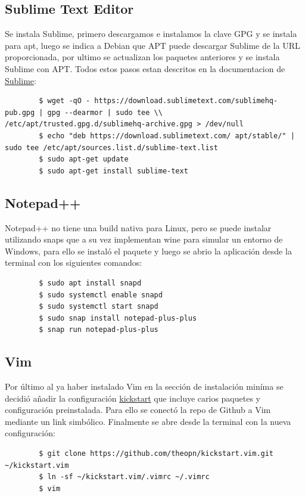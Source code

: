 \documentclass{article}
\begin{document}
    \subsection{Sublime Text Editor}
    Se instala Sublime, primero descargamos e instalamos la clave GPG y se instala para apt, luego se indica a Debian que APT puede descargar Sublime de la URL proporcionada, por ultimo se actualizan los paquetes anteriores y se instala Sublime con APT. Todos estos pasos estan descritos en la documentacion de \href{https://www.sublimetext.com/docs/linux_repositories.html#apt}{Sublime}:
    \begin{verbatim}
        $ wget -qO - https://download.sublimetext.com/sublimehq-pub.gpg | gpg --dearmor | sudo tee \\ /etc/apt/trusted.gpg.d/sublimehq-archive.gpg > /dev/null
        $ echo "deb https://download.sublimetext.com/ apt/stable/" | sudo tee /etc/apt/sources.list.d/sublime-text.list
        $ sudo apt-get update
        $ sudo apt-get install sublime-text
    \end{verbatim}
    \subsection{Notepad++}
    Notepad++ no tiene una build nativa para Linux, pero se puede instalar utilizando snaps que a su vez implementan wine para simular un entorno de Windows, para ello se instaló el paquete y luego se abrio la aplicación desde la terminal con los siguientes comandos:

    \begin{verbatim}
        $ sudo apt install snapd
        $ sudo systemctl enable snapd
        $ sudo systemctl start snapd
        $ sudo snap install notepad-plus-plus
        $ snap run notepad-plus-plus
    \end{verbatim}

    \subsection{Vim}
    Por último al ya haber instalado Vim en la sección de instalación miníma se decidió añadir la configuración \href{https://github.com/theopn/kickstart.vim}{kickstart} que incluye carios paquetes y configuración preinstalada. Para ello se conectó la repo de Github a Vim mediante un link simbólico. Finalmente se abre desde la terminal con la nueva configuración:
    
    \begin{verbatim}
        $ git clone https://github.com/theopn/kickstart.vim.git ~/kickstart.vim
        $ ln -sf ~/kickstart.vim/.vimrc ~/.vimrc
        $ vim
    \end{verbatim}    
\end{document}
